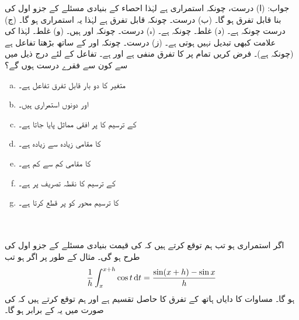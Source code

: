 جواب:\quad
(ا) درست، چونکہ  استمراری ہے لہٰذا احصاء کے بنیادی مسئلے کے جزو اول کی بنا  قابل تفرق ہو گا۔ (ب) درست۔ چونکہ  قابل تفرق ہے لہٰذا یہ استمراری ہو گا۔ (ج) درست چونکہ  ہے۔ (د) غلط۔ چونکہ  ہے۔ (ہ) درست۔ چونکہ  اور  ہیں۔ (و) غلط۔  لہٰذا  کی علامت کبھی تبدیل نہیں ہوتی ہے۔ (ز) درست۔ چونکہ  اور  کے ساتھ  بڑھتا تفاعل ہے (چونکہ  ہے)۔ 
فرض کریں تمام  پر  کا تفرق منفی ہے اور  ہے۔ تفاعل  کے لئے درج ذیل میں سے کون سے فقرے درست ہوں گے؟
\begin{enumerate}[a.]
\item
{} متغیر  کا دو بار قابل تفرق تفاعل ہے۔
\item
{} اور  دونوں استمراری ہیں۔
\item
{} کے ترسیم کا  پر افقی مماثل پایا جاتا ہے۔
\item
{} کا مقامی زیادہ سے زیادہ  ہے۔
\item
{} کا مقامی کم سے کم  ہے۔
\item
{} کے ترسیم کا نقطہ تصریف  پر ہے۔
\item
{} کا ترسیم  محور کو  پر قطع کرتا ہے۔
\end{enumerate}
\\
\\
اگر  استمراری ہو تب ہم توقع کرتے ہیں کہ  کی قیمت بنیادی مسئلے کے جزو اول کی طرح   ہو گی۔ مثال کے طور پر  اگر  ہو تب
\begin{align}\label{مساوات_تکمل_کوسائن_کا_تکمل}
\frac{1}{h}\int_x^{x+h}\cos t\dif t=\frac{\sin(x+h)-\sin x}{h}
\end{align}
ہو گا۔ مساوات  کا دایاں ہاتھ  کے تفرق کا حاصل تقسیم ہے اور ہم توقع کرتے ہیں کہ  کی صورت میں یہ  کے برابر ہو گا۔

